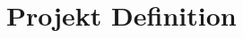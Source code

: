 \documentclass{hda/hdaConceptClass}
\begin{document}

\newpage
\chapter{Projekt Definition
}\label{chap:project}


\newpage


\newpage
\sitAppendix                 %
  \sitListOfTables
  \sitListOfFigures
  \sitListOfListings
  \sitListOfIdxInfos
  
\end{document}
